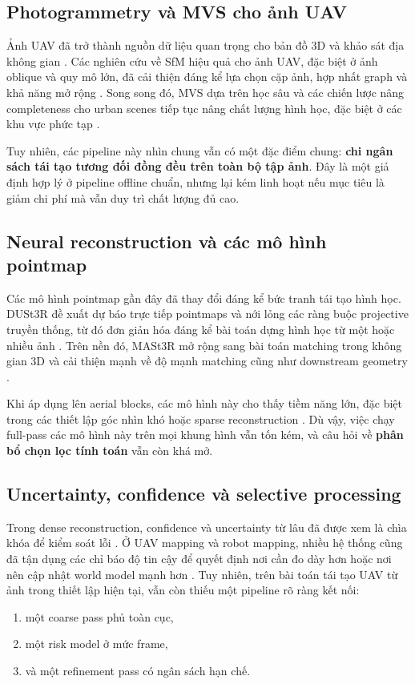 \documentclass[11pt,a4paper]{article}
\begin{document}
\subsection{Photogrammetry và MVS cho ảnh UAV}

Ảnh UAV đã trở thành nguồn dữ liệu quan trọng cho bản đồ 3D và khảo sát địa không gian \citep{Colomina2014Unmanned}. Các nghiên cứu về SfM hiệu quả cho ảnh UAV, đặc biệt ở ảnh oblique và quy mô lớn, đã cải thiện đáng kể lựa chọn cặp ảnh, hợp nhất graph và khả năng mở rộng \citep{Jiang2017Efficient,Jiang2020Efficient,Jiang2022Leveraging,Jiang2022Parallel,Jiang2024Efficient}. Song song đó, MVS dựa trên học sâu và các chiến lược nâng completeness cho urban scenes tiếp tục nâng chất lượng hình học, đặc biệt ở các khu vực phức tạp \citep{Liu2023Deep,Liao2024High}.

Tuy nhiên, các pipeline này nhìn chung vẫn có một đặc điểm chung: \textbf{chi ngân sách tái tạo tương đối đồng đều trên toàn bộ tập ảnh}. Đây là một giả định hợp lý ở pipeline offline chuẩn, nhưng lại kém linh hoạt nếu mục tiêu là giảm chi phí mà vẫn duy trì chất lượng đủ cao.

\subsection{Neural reconstruction và các mô hình pointmap}

Các mô hình pointmap gần đây đã thay đổi đáng kể bức tranh tái tạo hình học. DUSt3R đề xuất dự báo trực tiếp pointmaps và nới lỏng các ràng buộc projective truyền thống, từ đó đơn giản hóa đáng kể bài toán dựng hình học từ một hoặc nhiều ảnh \citep{Wang2024DUSt3R}. Trên nền đó, MASt3R mở rộng sang bài toán matching trong không gian 3D và cải thiện mạnh về độ mạnh matching cũng như downstream geometry \citep{Leroy2024MASt3R}.

Khi áp dụng lên aerial blocks, các mô hình này cho thấy tiềm năng lớn, đặc biệt trong các thiết lập góc nhìn khó hoặc sparse reconstruction \citep{Wu2025AerialBlocks}. Dù vậy, việc chạy full-pass các mô hình này trên mọi khung hình vẫn tốn kém, và câu hỏi về \textbf{phân bổ chọn lọc tính toán} vẫn còn khá mở.

\subsection{Uncertainty, confidence và selective processing}

Trong dense reconstruction, confidence và uncertainty từ lâu đã được xem là chìa khóa để kiểm soát lỗi \citep{Li2020Confidence}. Ở UAV mapping và robot mapping, nhiều hệ thống cũng đã tận dụng các chỉ báo độ tin cậy để quyết định nơi cần đo dày hơn hoặc nơi nên cập nhật world model mạnh hơn \citep{Campos2021ORB,Qin2018VINS,Wang2024Benchmarking}. Tuy nhiên, trên bài toán tái tạo UAV từ ảnh trong thiết lập hiện tại, vẫn còn thiếu một pipeline rõ ràng kết nối:
\begin{enumerate}[leftmargin=1.5em]
  \item một coarse pass phủ toàn cục,
  \item một risk model ở mức frame,
  \item và một refinement pass có ngân sách hạn chế.
\end{enumerate}
\end{document}
